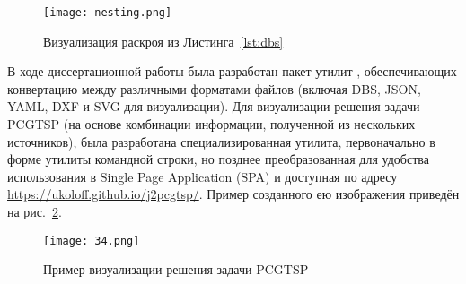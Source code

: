 \begin{figure}
  \centering
  \texttt{[image: nesting.png]}
  \caption{Визуализация раскроя из Листинга~\ref{lst:dbs}}
  \label{fig:nesting}
\end{figure}

В ходе диссертационной работы
была разработан пакет утилит
\autocite{bi:dbs2json},
обеспечивающих конвертацию между
различными форматами файлов
(включая DBS, JSON, YAML, DXF и SVG для визуализации).
Для визуализации решения задачи PCGTSP
(на основе комбинации информации,
полученной из нескольких источников),
была разработана специализированная утилита,
первоначально в форме утилиты командной строки,
но позднее преобразованная
для удобства использования в
Single Page Application
(SPA)
и доступная по адресу
\url{https://ukoloff.github.io/j2pcgtsp/}.
Пример созданного ею изображения
приведён на рис.~\ref{fig:pcgtsp.svg}.

\begin{figure}
  \centering
  \texttt{[image: 34.png]}
  \caption{Пример визуализации решения задачи PCGTSP}
  \label{fig:pcgtsp.svg}
\end{figure}
